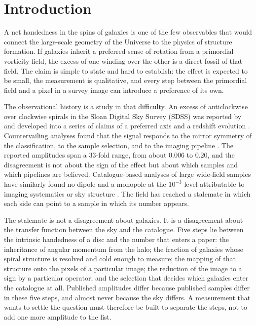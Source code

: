 \documentclass[linenumbers]{aa}
\begin{document}

\maketitle

\section{Introduction}

A net handedness in the spins of galaxies is one of the few observables that would connect the
large-scale geometry of the Universe to the physics of structure formation. If galaxies inherit a
preferred sense of rotation from a primordial vorticity field, the excess of one winding over the
other is a direct fossil of that field. The claim is simple to state and hard to establish: the
effect is expected to be small, the measurement is qualitative, and every step between the
primordial field and a pixel in a survey image can introduce a preference of its own.

The observational history is a study in that difficulty. An excess of anticlockwise over clockwise
spirals in the Sloan Digital Sky Survey (SDSS) was reported by \citet{longo2011} and
developed into a series of claims of a preferred axis and a redshift evolution
\citep{shamir2012, shamir2017, shamir2024}. Countervailing analyses found that the signal responds
to the mirror symmetry of the classification, to the sample selection, and to the imaging pipeline
\citep{land2008, hayes2017, iye2020}. The reported amplitudes span a 33-fold range, from
about $0.006$ to $0.20$, and the disagreement is not about the sign of the effect but about which
samples and which pipelines are believed. Catalogue-based analyses of large wide-field samples have
similarly found no dipole and a monopole at the $10^{-3}$ level attributable to imaging systematics
or sky structure \citep{desi2026}. The field has reached a stalemate in which each side can point to a sample in
which its number appears.

The stalemate is not a disagreement about galaxies. It is a disagreement about the transfer
function between the sky and the catalogue. Five steps lie between the intrinsic handedness of a
disc and the number that enters a paper: the inheritance of angular momentum from the halo; the
fraction of galaxies whose spiral structure is resolved and cold enough to measure; the mapping of
that structure onto the pixels of a particular image; the reduction of the image to a sign by a
particular operator; and the selection that decides which galaxies enter the catalogue at all.
Published amplitudes differ because published samples differ in these five steps, and almost never
because the sky differs. A measurement that wants to settle the question must therefore be built
to separate the steps, not to add one more amplitude to the list.
\end{document}
